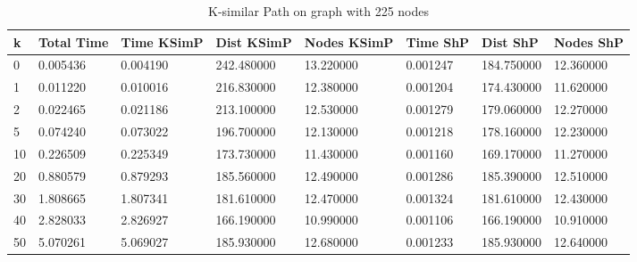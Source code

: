 \documentclass[]{article}
\numberwithin{equation}{section}
\begin{document}
\begin{appendices}
\begin{table}[H]
	\centering
	\small
	\setlength\tabcolsep{2pt}
	\begin{tabular}{|l|l|l|l|l|l|l|l|}
		\hline
		k  & Total Time & Time KSimP & Dist KSimP & Nodes KSimP & Time ShP & Dist ShP   & Nodes ShP \\ \hline
		0  & 0.005436   & 0.004190   & 242.480000 & 13.220000   & 0.001247 & 184.750000 & 12.360000 \\ \hline
		1  & 0.011220   & 0.010016   & 216.830000 & 12.380000   & 0.001204 & 174.430000 & 11.620000 \\ \hline
		2  & 0.022465   & 0.021186   & 213.100000 & 12.530000   & 0.001279 & 179.060000 & 12.270000 \\ \hline
		5  & 0.074240   & 0.073022   & 196.700000 & 12.130000   & 0.001218 & 178.160000 & 12.230000 \\ \hline
		10 & 0.226509   & 0.225349   & 173.730000 & 11.430000   & 0.001160 & 169.170000 & 11.270000 \\ \hline
		20 & 0.880579   & 0.879293   & 185.560000 & 12.490000   & 0.001286 & 185.390000 & 12.510000 \\ \hline
		30 & 1.808665   & 1.807341   & 181.610000 & 12.470000   & 0.001324 & 181.610000 & 12.430000 \\ \hline
		40 & 2.828033   & 2.826927   & 166.190000 & 10.990000   & 0.001106 & 166.190000 & 10.910000 \\ \hline
		50 & 5.070261   & 5.069027   & 185.930000 & 12.680000   & 0.001233 & 185.930000 & 12.640000 \\ \hline
	\end{tabular}
	\caption{K-similar Path on graph with 225 nodes}
\end{table}


\end{appendices}
\end{document}
